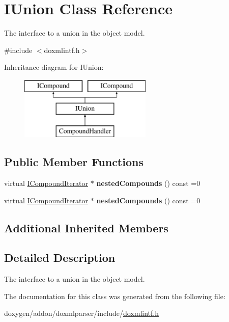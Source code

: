 \hypertarget{class_i_union}{}\section{I\+Union Class Reference}
\label{class_i_union}


The interface to a union in the object model.  




{\ttfamily \#include $<$doxmlintf.\+h$>$}

Inheritance diagram for I\+Union\+:\begin{figure}[H]
\begin{center}
\leavevmode
\includegraphics[height=3.000000cm]{class_i_union}
\end{center}
\end{figure}
\subsection*{Public Member Functions}
\begin{DoxyCompactItemize}
\item 
\mbox{\label{class_i_union_abef296914f43264ab9b37c2f0e379a6a}} 
virtual \mbox{\hyperlink{class_i_compound_iterator}{I\+Compound\+Iterator}} $\ast$ {\bfseries nested\+Compounds} () const =0
\item 
\mbox{\label{class_i_union_abef296914f43264ab9b37c2f0e379a6a}} 
virtual \mbox{\hyperlink{class_i_compound_iterator}{I\+Compound\+Iterator}} $\ast$ {\bfseries nested\+Compounds} () const =0
\end{DoxyCompactItemize}
\subsection*{Additional Inherited Members}


\subsection{Detailed Description}
The interface to a union in the object model. 

The documentation for this class was generated from the following file\+:\begin{DoxyCompactItemize}
\item 
doxygen/addon/doxmlparser/include/\mbox{\hyperlink{include_2doxmlintf_8h}{doxmlintf.\+h}}\end{DoxyCompactItemize}
